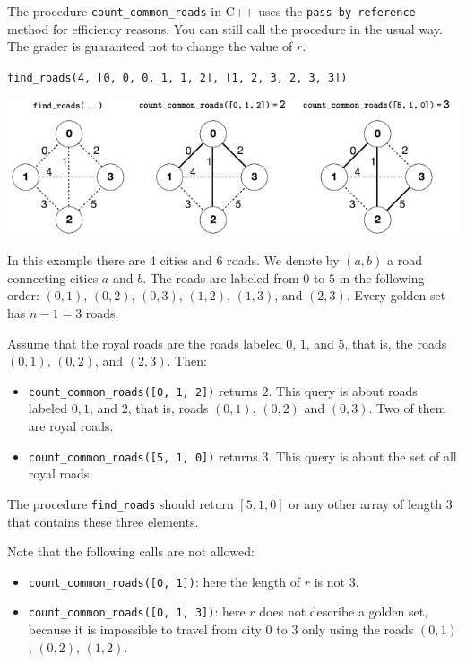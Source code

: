 The procedure \texttt{count\_common\_roads} in C++ uses the \texttt{pass by reference} method for efficiency reasons. You can still call the procedure in the usual way. The grader is guaranteed not to change the value of $r$.

\texttt{find\_roads(4, [0, 0, 0, 1, 1, 2], [1, 2, 3, 2, 3, 3])}


\includegraphics[scale=0.7]{1.png}

In this example there are $4$ cities and $6$ roads. We denote by $(a, b)$ a road connecting cities $a$ and $b$. The roads are labeled from $0$ to $5$ in the following order: $(0, 1)$, $(0, 2)$, $(0, 3)$, $(1, 2)$, $(1, 3)$, and $(2, 3)$. Every golden set has $n - 1 = 3$ roads.

Assume that the royal roads are the roads labeled $0$, $1$, and $5$, that is, the roads $(0, 1)$, $(0, 2)$, and $(2, 3)$. Then:
\begin{itemize}
\item \texttt{count\_common\_roads([0, 1, 2])} returns $2$. This query is about roads labeled $0, 1$, and $2$, that is, roads $(0, 1)$, $(0, 2)$ and $(0,3)$. Two of them are royal roads.
\item \texttt{count\_common\_roads([5, 1, 0])} returns $3$. This query is about the set of all royal roads.
\end{itemize}

The procedure \texttt{find\_roads} should return $[5, 1, 0]$ or any other array of length $3$ that contains these three elements.

Note that the following calls are not allowed:
\begin{itemize}
\item \texttt{count\_common\_roads([0, 1])}: here the length of $r$ is not $3$.
\item \texttt{count\_common\_roads([0, 1, 3])}: here $r$ does not describe a golden set,
because it is impossible to travel from city $0$ to $3$ only using the roads $(0,1)$, $(0,2)$, $(1,2)$.
\end{itemize}